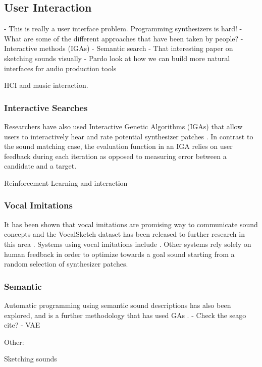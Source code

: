 \subsection{User Interaction}
- This is really a user interface problem. Programming synthesizers is hard!
- What are some of the different approaches that have been taken by people?
- Interactive methods (IGAs)
- Semantic search
- That interesting paper on sketching sounds visually
- Pardo look at how we can build more natural interfaces for audio production tools \cite{pardo2019learning} 

\cite{holland2013music} HCI and music interaction.

\subsubsection{Interactive Searches}
Researchers have also used Interactive Genetic Algorithms (IGAs) that allow users to interactively hear and rate potential synthesizer patches \cite{johnson1999exploring, dahlstedt2001creating, yee2016use}. In contrast to the sound matching case, the evaluation function in an IGA relies on user feedback during each iteration as opposed to measuring error between a candidate and a target. 

Reinforcement Learning and interaction \cite{scurto2021designing}

 \subsubsection{Vocal Imitations}
 It has been shown that vocal imitations are promising way to communicate sound concepts \cite{lemaitre2014effectiveness} and the VocalSketch dataset has been released to further research in this area \cite{cartwright2015vocalsketch}. Systems using vocal imitations include \cite{mcartwright2014}\cite{zhang2018visualization}. Other systems rely solely on human feedback in order to optimize towards a goal sound starting from a random selection of synthesizer patches. 
 
 \subsubsection{Semantic}
 Automatic programming using semantic sound descriptions has also been explored, and is a further methodology that has used GAs \cite{krekovic2016algorithm}.
 - Check the seago cite?
 \cite{roche2021make} - VAE
 
 Other:
 
 Sketching sounds \cite{lobbers2021sketching} \cite{knees2016searching}

% 
% 

% 
% 